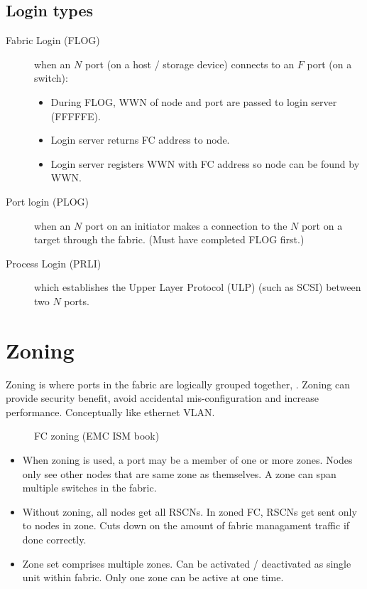 \subsection{Login types}\label{login-types}

\begin{description}
\item[Fabric Login (FLOG)]
when an \(N\) port (on a host / storage device) connects to an \(F\)
port (on a switch):

\begin{itemize}
\item
  During FLOG, WWN of node and port are passed to login server (FFFFFE).
\item
  Login server returns FC address to node.
\item
  Login server registers WWN with FC address so node can be found by
  WWN.
\end{itemize}
\item[Port login (PLOG)]
when an \(N\) port on an initiator makes a connection to the \(N\) port
on a target through the fabric. (Must have completed FLOG first.)
\item[Process Login (PRLI)]
which establishes the Upper Layer Protocol (ULP) (such as SCSI) between
two \(N\) ports.
\end{description}

\section{Zoning}\label{zoning}

Zoning is where ports in the fabric are logically grouped together, .
Zoning can provide security benefit, avoid accidental mis-configuration
and increase performance. Conceptually like ethernet VLAN.

\begin{figure}
\centering
\caption{FC zoning (EMC ISM book){}}
\end{figure}

\begin{itemize}
\item
  When zoning is used, a port may be a member of one or more zones.
  Nodes only see other nodes that are same zone as themselves. A zone
  can span multiple switches in the fabric.
\item
  Without zoning, all nodes get all RSCNs. In zoned FC, RSCNs get sent
  only to nodes in zone. Cuts down on the amount of fabric managament
  traffic if done correctly.
\item
  Zone set comprises multiple zones. Can be activated / deactivated as
  single unit within fabric. Only one zone can be active at one time.
\end{itemize}

